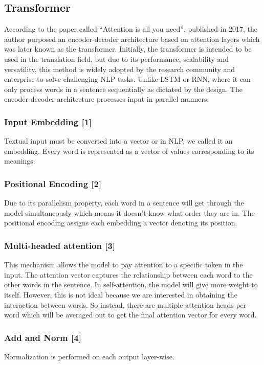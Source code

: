 \documentclass[12pt,oneside,openright,a4paper]{cpe-english-project}
\begin{document}
\subsection{Transformer}
According to the paper called “Attention is all you need”, published in 2017, the author purposed an encoder-decoder architecture based on attention layers which was later known as the transformer. Initially, the transformer is intended to be used in the translation field, but due to its performance, scalability and versatility, this method is widely adopted by the research community and enterprise to solve challenging NLP tasks. Unlike LSTM or RNN, where it can only process words in a sentence sequentially as dictated by the design. The encoder-decoder architecture processes input in parallel manners. 

\subsubsection{Input Embedding [1]}
Textual input must be converted into a vector or in NLP, we called it an embedding. Every word is represented as a vector of values corresponding to its meanings. 

\subsubsection{Positional Encoding [2]}
Due to its parallelism property, each word in a sentence will get through the model simultaneously which means it doesn't know what order they are in. The positional encoding assigns each embedding a vector denoting its position.

\subsubsection{Multi-headed attention [3]}
This mechanism allows the model to pay attention to a specific token in the input. The attention vector captures the relationship between each word to the other words in the sentence. In self-attention, the model will give more weight to itself. However, this is not ideal because we are interested in obtaining the interaction between words. So instead, there are multiple attention heads per word which will be averaged out to get the final attention vector for every word.

\subsubsection{Add and Norm [4]}
Normalization is performed on each output layer-wise.
\end{document}
